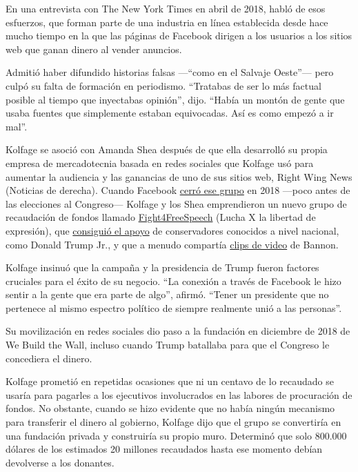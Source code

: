 En una entrevista con The New York Times en abril de 2018, habló de esos
esfuerzos, que forman parte de una industria en línea establecida desde
hace mucho tiempo en la que las páginas de Facebook dirigen a los
usuarios a los sitios web que ganan dinero al vender anuncios.

Admitió haber difundido historias falsas ---``como en el Salvaje
Oeste''--- pero culpó su falta de formación en periodismo. ``Tratabas de
ser lo más factual posible al tiempo que inyectabas opinión'', dijo.
``Había un montón de gente que usaba fuentes que simplemente estaban
equivocadas. Así es como empezó a ir mal''.

Kolfage se asoció con Amanda Shea después de que ella desarrolló su
propia empresa de mercadotecnia basada en redes sociales que Kolfage usó
para aumentar la audiencia y las ganancias de uno de sus sitios web,
Right Wing News (Noticias de derecha). Cuando Facebook
\href{https://www.facebookcorewwwi.onion/Brian.Kolfage.jr/posts/facebook-lied-they-shut-down-my-page-because-it-was-conservative-powerful-and-th/2211141405766130/}{cerró
ese grupo} en 2018 ---poco antes de las elecciones al Congreso---
Kolfage y los Shea emprendieron un nuevo grupo de recaudación de fondos
llamado
\href{https://www.facebookcorewwwi.onion/Fight4Speech/}{Fight4FreeSpeech}
(Lucha X la libertad de expresión), que
\href{https://int.graylady3jvrrxbe.onion/data/documenttools/2018-10-don-trump-jr/2dafd9fc6596ae66/full.pdf}{consiguió
el apoyo} de conservadores conocidos a nivel nacional, como Donald Trump
Jr., y que a menudo compartía
\href{https://www.facebookcorewwwi.onion/Fight4Speech/videos/734904533974973/}{clips
de video} de Bannon.

Kolfage insinuó que la campaña y la presidencia de Trump fueron factores
cruciales para el éxito de su negocio. ``La conexión a través de
Facebook le hizo sentir a la gente que era parte de algo'', afirmó.
``Tener un presidente que no pertenece al mismo espectro político de
siempre realmente unió a las personas''.

Su movilización en redes sociales dio paso a la fundación en diciembre
de 2018 de We Build the Wall, incluso cuando Trump batallaba para que el
Congreso le concediera el dinero.

Kolfage prometió en repetidas ocasiones que ni un centavo de lo
recaudado se usaría para pagarles a los ejecutivos involucrados en las
labores de procuración de fondos. No obstante, cuando se hizo evidente
que no había ningún mecanismo para transferir el dinero al gobierno,
Kolfage dijo que el grupo se convertiría en una fundación privada y
construiría su propio muro. Determinó que solo 800.000 dólares de los
estimados 20 millones recaudados hasta ese momento debían devolverse a
los donantes.

